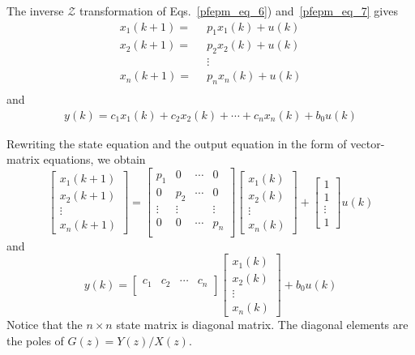 \documentclass[11pt,a4paper,oneside]{book}
\numberwithin{equation}{section}
\theoremstyle{it}
\theoremstyle{definition}
\begin{document}
The inverse $\mathcal{Z}$ transformation of Eqs.~\eqref{pfepm_eq_6}) 
and~\eqref{pfepm_eq_7} gives
\begin{equation}\label{pfepm_eq_8}
	\begin{aligned}
		x_1(k+1) =& \enspace p_1x_1(k)+u(k) \\[6pt]
		x_2(k+1) =& \enspace p_2x_2(k)+u(k) \\[6pt]
		& \enspace\vdots \\[6pt]
		x_n(k+1) =& \enspace p_nx_n(k)+u(k) \\[6pt]
	\end{aligned}
\end{equation}
and
\begin{equation}\label{pfepm_eq_9}
	\begin{aligned}
		y(k) = c_1x_1(k)+c_2x_2(k)+\cdots+c_nx_n(k)+b_0u(k)
	\end{aligned}
\end{equation}

Rewriting the state equation and the output equation in the form of 
vector-matrix equations, we obtain
\begin{equation}\label{pfepm_eq_10}
	\left[\begin{matrix}
		x_1(k+1) \\
		x_2(k+1) \\
		\vdots \\
		x_n(k+1)
	\end{matrix}\right] = 
	\left[\begin{matrix}
		p_1 & 0 & \cdots & 0 \\
		0 & p_2 & \cdots & 0 \\
		\vdots & \vdots & & \vdots\\
		0 & 0 & \cdots & p_n \\
	\end{matrix}\right]
	\left[\begin{matrix}
		x_1(k) \\
		x_2(k) \\
		\vdots \\
		x_n(k)
	\end{matrix}\right] + 
	\left[\begin{matrix}
		1 \\
		1 \\
		\vdots \\
		1
	\end{matrix}\right] u(k)
\end{equation}
and
\begin{equation}\label{pfepm_eq_11}
	y(k) = 
	\left[\begin{matrix}
		c_1 & c_2 & \cdots & c_n \\
	\end{matrix}\right] 
	\left[\begin{matrix}
		x_1(k) \\
		x_2(k) \\
		\vdots \\
		x_n(k)
	\end{matrix}\right] + b_0 u(k)
\end{equation}
Notice that the $n \times n$ state matrix is diagonal matrix. The diagonal 
elements are the poles of $G(z) = {Y(z)}/{X(z)}$.
\end{document}
